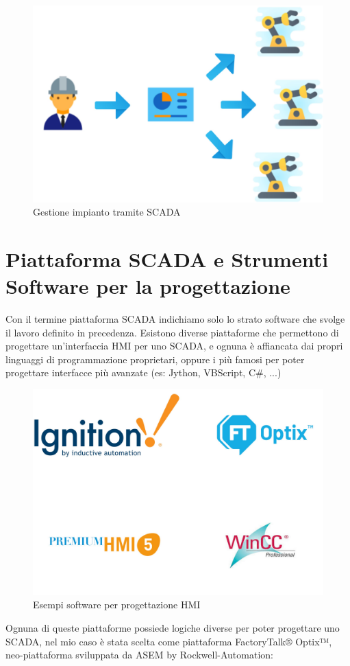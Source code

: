 \begin{figure}
    \centering
    \includegraphics[width=0.5\linewidth]{Immagini/Operatore_SCADA.jpg}
    \caption{Gestione impianto tramite SCADA}
    \label{fig:Operatore_SCADA.jpg}
\end{figure}

\section{Piattaforma SCADA e Strumenti Software per la progettazione}
Con il termine piattaforma SCADA indichiamo solo lo strato software che svolge il lavoro definito in precedenza. Esistono diverse piattaforme che permettono di progettare un'interfaccia HMI per uno SCADA, e ognuna è affiancata dai propri linguaggi di programmazione proprietari, oppure i più famosi per poter progettare interfacce più avanzate (es: Jython, VBScript, C\#, ...)

\begin{figure} [ht]
    \centering
    \includegraphics[width=0.5\linewidth]{Immagini/loghi.jpg}
    \caption{Esempi software per progettazione HMI}
    \label{fig:loghi.jpg}
\end{figure}

Ognuna di queste piattaforme possiede logiche diverse per poter progettare uno SCADA, nel mio caso è stata scelta come piattaforma FactoryTalk® Optix™, neo-piattaforma sviluppata da ASEM by Rockwell-Automation: 

